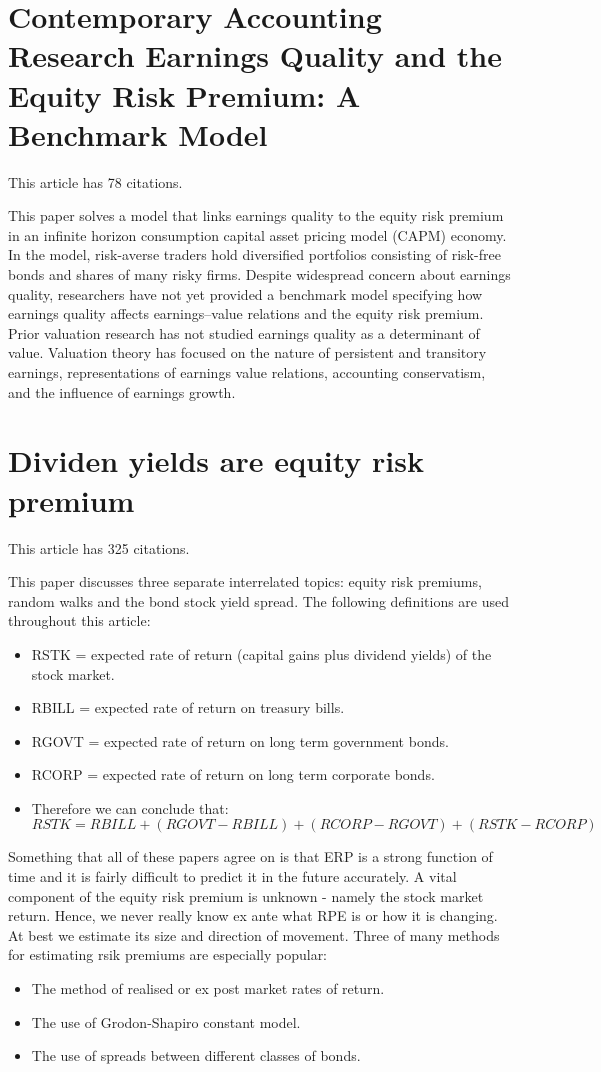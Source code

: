 \documentclass[12 pt]{article}
\begin{document}
\section{Contemporary Accounting Research Earnings Quality and the Equity Risk Premium: A Benchmark Model}
This article has 78 citations. \\
\par This paper solves a model that links earnings quality to the equity risk premium in an infinite horizon consumption capital asset pricing model (CAPM) economy. In the model, risk-averse traders hold diversified portfolios consisting of risk-free bonds and shares of many risky firms. Despite widespread concern about earnings quality, researchers have not yet provided a benchmark model specifying how earnings quality affects earnings–value relations and the equity risk premium. Prior valuation research has not studied earnings quality as a determinant of value. Valuation theory has focused on the nature of persistent and transitory earnings, representations of earnings value relations, accounting conservatism, and the influence of earnings growth.
\section{Dividen yields are equity risk premium}
This article has 325 citations. \\
\par This paper discusses three separate interrelated topics: equity risk premiums, random walks and the bond stock yield spread. The following definitions are used throughout this article: 
\begin{itemize}
\item RSTK = expected rate of return (capital gains plus dividend yields) of the stock market. 
\item RBILL = expected rate of return on treasury bills.
\item RGOVT = expected rate of return on long term government bonds. 
\item RCORP = expected rate of return on long term corporate bonds. 
\item Therefore we can conclude that: 
\[
RSTK = RBILL + (RGOVT - RBILL) + (RCORP - RGOVT) + (RSTK - RCORP) 
\]
\end{itemize}
Something that all of these papers agree on is that ERP is a strong function of time and it is fairly difficult to predict it in the future accurately. A vital component of the equity risk premium is unknown - namely the stock market return. Hence, we never really know ex ante what RPE is or how it is changing. At best we estimate its size and direction of movement. Three of many methods for estimating rsik premiums are especially popular: 
\begin{itemize}
\item The method of realised or ex post market rates of return. 
\item The use of Grodon-Shapiro constant model.
\item The use of spreads between different classes of bonds. 
\end{itemize}
\end{document}
